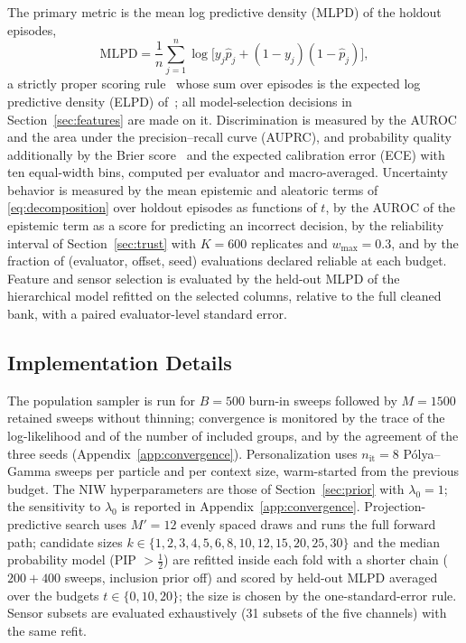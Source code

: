 \documentclass[lettersize,journal]{IEEEtran}
\begin{document}
The primary metric is the mean log predictive density (MLPD) of the holdout episodes,
\begin{equation}
 \mathrm{MLPD}=\frac{1}{n}\sum_{j=1}^{n}\log\big[y_j\widehat p_j+(1-y_j)(1-\widehat p_j)\big],
\end{equation}
a strictly proper scoring rule~\cite{gneiting2007strictly} whose sum over episodes is the expected log predictive density (ELPD) of~\cite{vehtari2017loo}; all model-selection decisions in Section~\ref{sec:features} are made on it. Discrimination is measured by the AUROC and the area under the precision--recall curve (AUPRC), and probability quality additionally by the Brier score~\cite{brier1950verification} and the expected calibration error (ECE) with ten equal-width bins, computed per evaluator and macro-averaged. Uncertainty behavior is measured by the mean epistemic and aleatoric terms of \eqref{eq:decomposition} over holdout episodes as functions of $t$, by the AUROC of the epistemic term as a score for predicting an incorrect decision, by the reliability interval of Section~\ref{sec:trust} with $K=600$ replicates and $w_{\max}=0.3$, and by the fraction of (evaluator, offset, seed) evaluations declared reliable at each budget. Feature and sensor selection is evaluated by the held-out MLPD of the hierarchical model refitted on the selected columns, relative to the full cleaned bank, with a paired evaluator-level standard error.

\subsection{Implementation Details}
\label{sec:implementation}

The population sampler is run for $B=500$ burn-in sweeps followed by $M=1500$ retained sweeps without thinning; convergence is monitored by the trace of the log-likelihood and of the number of included groups, and by the agreement of the three seeds (Appendix~\ref{app:convergence}). Personalization uses $n_{\mathrm{it}}=8$ P\'{o}lya--Gamma sweeps per particle and per context size, warm-started from the previous budget. The NIW hyperparameters are those of Section~\ref{sec:prior} with $\lambda_0=1$; the sensitivity to $\lambda_0$ is reported in Appendix~\ref{app:convergence}. Projection-predictive search uses $M'=12$ evenly spaced draws and runs the full forward path; candidate sizes $k\in\{1,2,3,4,5,6,8,10,12,15,20,25,30\}$ and the median probability model (PIP $>\tfrac12$) are refitted inside each fold with a shorter chain ($200+400$ sweeps, inclusion prior off) and scored by held-out MLPD averaged over the budgets $t\in\{0,10,20\}$; the size is chosen by the one-standard-error rule. Sensor subsets are evaluated exhaustively (31 subsets of the five channels) with the same refit.
\end{document}
